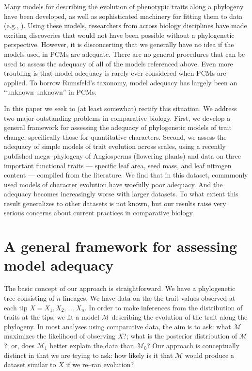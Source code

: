 \documentclass[a4paper,12pt]{article}
\begin{document}
Many models for describing the evolution of phenotypic traits along a phylogeny have been developed, as well as sophisticated machinery for fitting them to data (e.g., \citep{Felsenstein1985, Hansen1997, Pagel1999, Blomberg2003, ButlerKing2004, Omeara2006, Eastman2011, Beaulieu2012, SlaterMEE}). Using these models, researchers from across biology disciplines have made exciting discoveries that would not have been possible without a phylogenetic perspective. However, it is disconcerting that we generally have no idea if the models used in PCMs are adequate. There are no general procedures that can be used to assess the adequacy of all of the models referenced above. Even more troubling is that model adequacy is rarely ever considered when PCMs are applied. To borrow Rumsfeld's taxonomy, model adequacy has largely been an ``unknown unknown'' in PCMs.

In this paper we seek to (at least somewhat) rectify this situation. We address two major outstanding problems in comparative biology. First, we develop a general framework for assessing the adequacy of phylogenetic models of trait change, specifically those for quantitative characters. Second, we assess the adequacy of simple models of trait evolution across scales, using a recently published mega--phylogeny of Angiosperms (flowering plants) \citep{Zanne2013} and data on three important functional traits --- specific leaf area, seed mass, and leaf nitrogen content --- compiled from the literature. We find that in this dataset, commmonly used models of character evolution have woefully poor adequacy. And the adequacy becomes increasingly worse with larger datasets. To what extent this result generalizes to other datasets is not known, but our results raise very serious concerns about current practices in comparative biology.

\section{A general framework for assessing model adequacy}
The basic concept of our approach is straightforward. We have a phylogenetic tree consisting of $n$ lineages. We have data on the the trait values observed at each tip $X = X_1, X_2, \ldots, X_n$. In order to make inferences from the distribution of traits at the tips, we fit a model $\mathcal{M}$ describing the evolution of the trait along the phylogeny. In most analyses using comparative data, the aim is to ask: what $\mathcal{M}$ maximizes the likelihood of observing $X$?; what is the posterior distribution of $\mathcal{M}$?; or, does $\mathcal{M}_1$ better explain the data than $\mathcal{M}_0$? Our approach is conceptually distinct in that we are trying to ask: how likely is it that $\mathcal{M}$ would produce a dataset similar to $X$ if we re--ran evolution?
\end{document}
